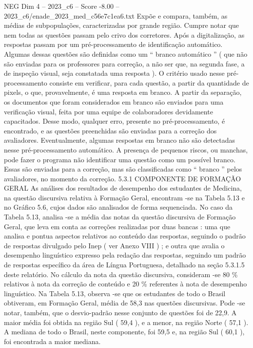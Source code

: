 \begin{textsample}{NEG Dim 4 – 2023\_c6 – Score -8.00 – 2023\_c6/enade\_2023\_med\_c56e7c1ea6.txt}
Expõe e compara, também, as médias de subpopulações, caracterizadas por grande região.
Cumpre notar que nem todas as questões passam pelo crivo dos corretores.
Após a digitalização, as respostas passam por um pré-processamento de identificação automático.
Algumas dessas questões são definidas como um “ branco automático ” ( que não são enviadas para os professores para correção, a não ser que, na segunda fase, a de inspeção visual, seja constatada uma resposta ).
O critério usado nesse pré-processamento consiste em verificar, para cada questão, a partir da quantidade de pixels, o que, provavelmente, é uma resposta em branco.
A partir da separação, os documentos que foram considerados em branco são enviados para uma verificação visual, feita por uma equipe de colaboradores devidamente capacitados.
Desse modo, qualquer erro, presente no pré-processamento, é encontrado, e as questões preenchidas são enviadas para a correção dos avaliadores.
Eventualmente, algumas respostas em branco não são detectadas nesse pré-processamento automático.
A presença de pequenos riscos, ou manchas, pode fazer o programa não identificar uma questão como um possível branco.
Essas são enviadas para a correção, mas são classificadas como “ branco ” pelos avaliadores, no momento da correção. 5.3.1 COMPONENTE DE FORMAÇÃO GERAL As análises dos resultados de desempenho dos estudantes de Medicina, na questão discursiva relativa à Formação Geral, encontram -se na Tabela 5.13 e no Gráfico 5.6, cujos dados são analisados de forma sequenciada.
No caso da Tabela 5.13, analisa -se a média das notas da questão discursiva de Formação Geral, que leva em conta as correções realizadas por duas bancas : uma que analisa e pontua aspectos relativos ao conteúdo das respostas, seguindo o padrão de respostas divulgado pelo Inep ( ver Anexo VIII ) ; e outra que avalia o desempenho linguístico expresso pela redação das respostas, seguindo um padrão de respostas específico da área de Língua Portuguesa, detalhado na seção 5.3.1.5 deste relatório.
No cálculo da nota da questão discursiva, consideram -se 80 \% relativos à nota da correção de conteúdo e 20 \% referentes à nota de desempenho linguístico.
Na Tabela 5.13, observa -se que os estudantes de todo o Brasil obtiveram, em Formação Geral, média de 58,3 nas questões discursivas.
Pode -se notar, também, que o desvio-padrão nesse conjunto de questões foi de 22,9.
A maior média foi obtida na região Sul ( 59,4 ), e a menor, na região Norte ( 57,1 ).
A mediana de todo o Brasil, neste componente, foi 59,5 e, na região Sul ( 60,1 ), foi encontrada a maior mediana.

\end{textsample}
